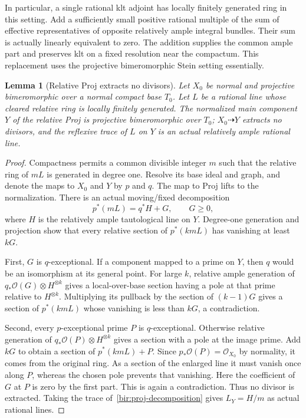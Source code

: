 \documentclass[11pt,letterpaper]{article}
\newtheorem{lemma}[theorem]{Lemma}
\theoremstyle{definition}
\theoremstyle{remark}
\begin{document}
In particular, a single rational klt adjoint has locally finitely
generated ring in this setting.  Add a sufficiently small positive
rational multiple of the sum of effective representatives of opposite
relatively ample integral bundles.  Their sum is actually linearly
equivalent to zero.  The addition supplies the common ample part and
preserves klt on a fixed resolution near the compactum.  This
replacement uses the projective bimeromorphic Stein setting
essentially.

\begin{lemma}[Relative Proj extracts no divisors]
\label{bir:proj-nonextraction}
Let $X_0$ be normal and projective bimeromorphic over a normal compact
base $T_0$.  Let $L$ be a rational line whose cleared relative ring is
locally finitely generated.  The normalized main component $Y$ of the
relative Proj is projective bimeromorphic over $T_0$;
$X_0\dashrightarrow Y$ extracts no divisors, and the reflexive trace
of $L$ on $Y$ is an actual relatively ample rational line.
\end{lemma}

\begin{proof}
Compactness permits a common divisible integer $m$ such that the
relative ring of $mL$ is generated in degree one.  Resolve its base
ideal and graph, and denote the maps to $X_0$ and $Y$ by $p$ and $q$.
The map to Proj lifts to the normalization.  There is an actual
moving/fixed decomposition
\begin{equation}
 p^*(mL)=q^*H+G,\qquad G\geq0,
 \label{bir:proj-decomposition}
\end{equation}
where $H$ is the relatively ample tautological line on $Y$.  Degree-one
generation and projection show that every relative section of
$p^*(kmL)$ has vanishing at least $kG$.

First, $G$ is $q$-exceptional.  If a component mapped to a prime on
$Y$, then $q$ would be an isomorphism at its general point.  For large
$k$, relative ample generation of
$q_*\mathcal{O}(G)\otimes H^{\otimes k}$ gives a local-over-base section having
a pole at that prime relative to $H^{\otimes k}$.  Multiplying its
pullback by the section of $(k-1)G$ gives a section of $p^*(kmL)$ whose
vanishing is less than $kG$, a contradiction.

Second, every $p$-exceptional prime $P$ is $q$-exceptional.  Otherwise
relative generation of $q_*\mathcal{O}(P)\otimes H^{\otimes k}$ gives a section
with a pole at the image prime.  Add $kG$ to obtain a section of
$p^*(kmL)+P$.  Since $p_*\mathcal{O}(P)=\mathcal{O}_{X_0}$ by normality, it comes from
the original ring.  As a section of the enlarged line it must vanish
once along $P$, whereas the chosen pole prevents that vanishing.
Here the coefficient of $G$ at $P$ is zero by the first part.  This is
again a contradiction.  Thus no divisor is extracted.  Taking the
trace of~\eqref{bir:proj-decomposition} gives $L_Y=H/m$ as actual
rational lines.
\end{proof}
\end{document}

